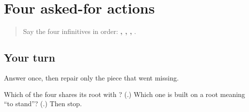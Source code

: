 \section[dyā / pyā / āṇā / ṭhevā]{Four asked-for actions}

\label{lesson:MR-R22-request-verbs}



\begin{quote}
Say the four infinitives in order: \textbf{, , , }.
\end{quote}

\subsection*{Your turn}
Answer once, then repair only the piece that went missing.

\begin{tcolorbox}[breakable,colback=teal!4,colframe=teal!35!black,title={Before you move on}]
Which of the four shares its root with \textbf{}? (\textbf{}.) Which one is built on a root meaning \textquotedblleft{}to stand\textquotedblright{}? (\textbf{}.) Then stop.
\end{tcolorbox}
